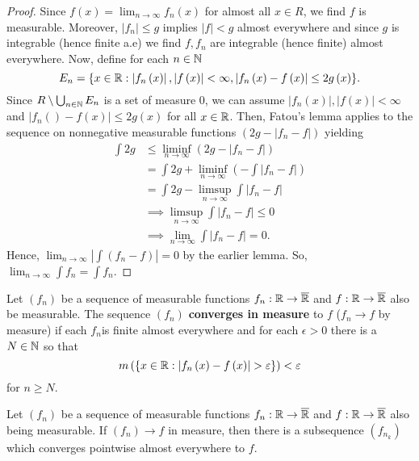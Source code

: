 \begin{proof}
	Since \(f\left( x \right)  = \lim_{n \to \infty}f_{n}\left( x \right) \) for almost all \(x \in R\), we find \(f\) is measurable. Moreover, \(\left| f_{n} \right| \le g\) implies \(\left| f \right| < g\) almost everywhere and since \(g\) is integrable (hence finite a.e) we find \(f, f_{n}\) are integrable (hence finite) almost everywhere. Now, define for each \(n \in \mathbb{N}\) \[
		E_{n} = \{x \in \mathbb{R} : \left| f_{n}\left( x \right)  \right| , \left| f\left( x \right)  \right| < \infty, \left| f_{n}\left( x \right) - f\left( x \right)  \right| \le 2g\left( x \right) \}
	.\]
	Since \(R \setminus \bigcup_{n \in \mathbb{N}} E_{n}\) is a set of measure \(0\), we can assume \(\left| f_{n}\left( x \right)  \right| , \left| f\left( x \right)  \right| < \infty\) and \(\left| f_{n}\left(  \right) -f\left( x \right)  \right| \le 2g\left( x \right) \) for all \(x \in \mathbb{R}\). Then, Fatou's lemma applies to the sequence on nonnegative measurable functions \(\left( 2g - \left| f_{n} - f \right|  \right) \)  yielding
	\begin{align*}
		\int 2g &\le \liminf_{n \to \infty} \left( 2g - \left| f_{n} - f \right|  \right) \\
			&= \int 2g + \liminf_{n \to \infty} \left( - \int \left| f_{n} - f \right|  \right)  \\
			&= \int 2g - \limsup_{n \to \infty}  \int \left| f_{n} - f \right|  \\
			&\implies \limsup_{n \to \infty} \int \left| f_{n} - f  \right| \le 0\\
			&\implies \lim_{n \to \infty} \int \left| f_{n} - f \right| = 0
	.\end{align*}
	Hence, \(\lim_{n \to \infty}\left| \int \left( f_{n} - f \right)  \right|  = 0\) by the earlier lemma. So, \(\lim_{n \to \infty} \int f_{n} = \int f_{n}\).
\end{proof}
\begin{definition}
	Let \(\left( f_{n} \right) \) be a sequence of measurable functions \(f_{n}: \mathbb{R} \to \overline{\mathbb{R}}\) and \(f: \mathbb{R} \to \overline{\mathbb{R}}\) also be measurable. The sequence \(\left( f_{n} \right) \) \textbf{converges in measure} to \(f\) (\(f_{n} \to f\) by measure) if each \(f_{n}\)is finite almost everywhere and for each \(\epsilon > 0\) there is a \(N \in \mathbb{N}\) so that \[
		m\left( \{x \in \mathbb{R}: \left| f_{n}\left( x \right) - f\left( x \right) \right| > \varepsilon\}  \right) < \varepsilon
	\] for \(n \ge N\).
\end{definition}
\begin{theorem}[Riesz]
	Let \(\left( f_{n} \right) \) be a sequence of measurable functions \(f_{n}: \mathbb{R} \to \overline{\mathbb{R}}\) and \(f: \mathbb{R} \to \overline{\mathbb{R}}\) also being measurable. If \(\left( f_{n} \right) \to f\) in measure, then there is a subsequence \(\left( f_{n_{k}} \right) \) which converges pointwise almost everywhere to \(f\).
\end{theorem}
